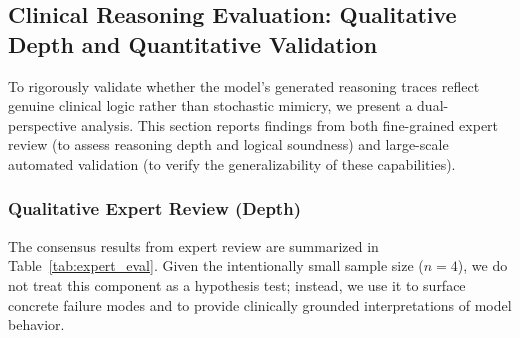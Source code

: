\documentclass[preprint,5p,times,twocolumn,fleqn]{elsarticle}
\begin{document}
\begin{table}[!htbp]
  \centering
  \caption{Sensitivity analysis of the keyword weight factor $\alpha$ on the internal validation set.}
  \label{tab:ablation_alpha}
  \setlength{\tabcolsep}{3pt}
\end{table}

\subsection{Clinical Reasoning Evaluation: Qualitative Depth and Quantitative Validation}
\label{sec:clinical_eval}
To rigorously validate whether the model's generated reasoning traces reflect genuine clinical logic rather than stochastic mimicry, we present a dual-perspective analysis. This section reports findings from both fine-grained expert review (to assess reasoning depth and logical soundness) and large-scale automated validation (to verify the generalizability of these capabilities).

\subsubsection{Qualitative Expert Review (Depth)}
The consensus results from expert review are summarized in Table~\ref{tab:expert_eval}. Given the intentionally small sample size ($n=4$), we do not treat this component as a hypothesis test; instead, we use it to surface concrete failure modes and to provide clinically grounded interpretations of model behavior.
\end{document}
